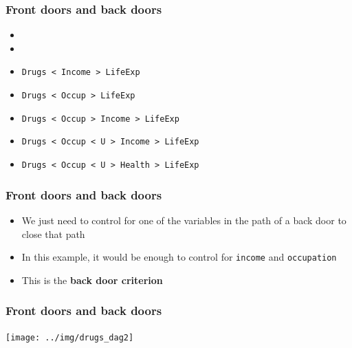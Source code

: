 \documentclass[aspectratio=43]{beamer}
\begin{document}
\begin{frame}
\frametitle{Front doors and back doors}
\centering

\begin{itemize}
  \item {}
  \item {}
  \item \texttt{Drugs < Income > LifeExp}
  \item \texttt{Drugs < Occup > LifeExp}
  \item \texttt{Drugs < Occup > Income > LifeExp}
  \item \texttt{Drugs < Occup < U > Income > LifeExp}
  \item \texttt{Drugs < Occup < U > Health > LifeExp}
\end{itemize}

\end{frame}

\begin{frame}
\frametitle{Front doors and back doors}
\centering

\begin{itemize}
  \item We just need to control for one of the variables in the path of a back door to close that path
  \item In this example, it would be enough to control for \texttt{income} and \texttt{occupation}
  \item This is the \textbf{back door criterion}
\end{itemize}

\end{frame}


\begin{frame}
\frametitle{Front doors and back doors}
\centering

\texttt{[image: ../img/drugs\_dag2]}

\end{frame}
\end{document}
